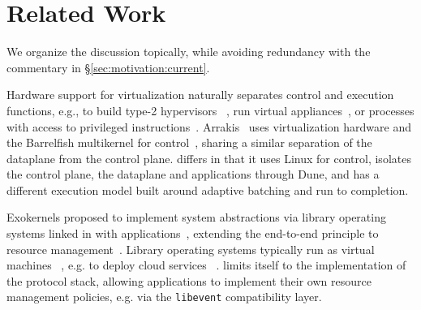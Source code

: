 

\section{Related Work}
\label{sec:related}

We organize the discussion topically, while avoiding redundancy with
the commentary in \S\ref{sec:motivation:current}.

 Hardware support for
virtualization naturally separates control and execution functions,
e.g., to build type-2 hypervisors
~\cite{DBLP:journals/tocs/BugnionDRSW12,misc/kivity07kvm}, run virtual
appliances~\cite{DBLP:conf/lisa/SapuntzakisBCZCLR03}, or processes
with access to privileged instructions~\cite{dune}.
Arrakis~\cite{arrakis-osdi} uses virtualization
hardware and the Barrelfish multikernel for
control~\cite{DBLP:conf/sosp/BaumannBDHIPRSS09}, sharing a similar
separation of the dataplane from the control plane. \ix differs in
that it uses Linux for control, isolates the control plane, the
dataplane and applications through Dune, and has a different execution
model built around adaptive batching and run to completion.


 Exokernels proposed to
implement system abstractions via library operating systems linked in
with applications~\cite{DBLP:conf/sosp/EnglerKO95}, extending the
end-to-end principle to resource
management~\cite{DBLP:journals/tocs/SaltzerRC84}.  Library operating
systems typically run as virtual machines
~\cite{DBLP:journals/tocs/BugnionDGR97}, e.g. to deploy cloud services
~\cite{DBLP:conf/asplos/MadhavapeddyMRSSGSHC13}. \ix limits itself to
the implementation of the protocol stack, allowing applications to
implement their own resource management policies, e.g. via the
\texttt{libevent} compatibility layer.

\begin{comment}
\myparagraph{User-level networking stacks:} User-level network
stacks~\cite{jeong2014mtcp, sandstorm, openonload} can
outperform kernel-based implementations through specialization and
elimination of redundant layers and abstractions, but trade-off
performance for a weaker security model.  The \ix dataplane
demonstrates that a specialized networking stack can offer performance
and cooperate with applications without having to weaken security and
isolation properties.
 
\myparagraph{Hardware and protocol specialization:} Applications can
use a connection-less UDP-based protocol for
scalability~\cite{DBLP:conf/nsdi/NishtalaFGKLLMPPSSTV13}.  Latency-sensitive datacenter
applications can use specialized Infiniband adapters to expose RDMA
with $1-3$\microsecond latencies to
applications~\cite{dragojevic14farm,DBLP:conf/icpp/JoseSLZHWIOWSP11, mitchell:rdma, DBLP:conf/sosp/OngaroRSOR11}.
Specialized FGPAs can replace conventional servers for important
applications such as
memcached~\cite{DBLP:conf/hotcloud/BlottKLVBI13,DBLP:conf/fpga/ChalamalasettiLWARM13,HPHA:Tanaka:2014}.
\ix is designed to allow TCP/IP to scale with architectural trends by
eliminating kernel bottlenecks.
\end{comment}


